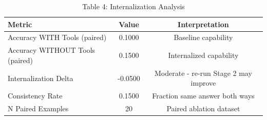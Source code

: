 \begin{table}[htbp]
  \centering
  \caption{Table 4: Internalization Analysis}
  \begin{tabular}{lcc}
    \toprule
    \textbf{Metric} & \textbf{Value} & \textbf{Interpretation} \\
    \midrule
    Accuracy WITH Tools (paired) & 0.1000 & Baseline capability \\
    Accuracy WITHOUT Tools (paired) & 0.1500 & Internalized capability \\
    Internalization Delta & -0.0500 & Moderate - re-run Stage 2 may improve \\
    Consistency Rate & 0.1500 & Fraction same answer both ways \\
    N Paired Examples & 20 & Paired ablation dataset \\
    \bottomrule
  \end{tabular}
\end{table}